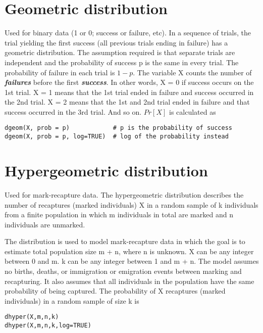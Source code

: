 \documentclass[12pt, a4paper]{article}
\theoremstyle{plain}
\theoremstyle{definition}
\theoremstyle{remark}
\begin{document}
\section{Geometric distribution}
Used for binary data (1 or 0; success or failure, etc). In a sequence of trials, the trial yielding the first success (all previous trials ending in failure) has a geometric distribution. The assumption required is that separate trials are independent and the probability of success p is the same in every trial. The probability of failure in each trial is $1 - p$.
\newpage
The variable X counts the number of \textbf{\textit{failures}} before the first \textbf{\textit{success}}. In other words, X = 0 if success occurs on the 1st trial. X = 1 means that the 1st trial ended in failure and success occurred in the 2nd trial. X = 2 means that the 1st and 2nd trial ended in failure and that success occurred in the 3rd trial. And so on. $Pr[X]$ is calculated as
\begin{framed}
\begin{verbatim}
dgeom(X, prob = p)            # p is the probability of success
dgeom(X, prob = p, log=TRUE)  # log of the probability instead
\end{verbatim}
\end{framed}

\newpage
\section{Hypergeometric distribution}
Used for mark-recapture data. The hypergeometric distribution describes the number of recaptures (marked individuals) X in a random sample of k individuals from a finite population in which m individuals in total are marked and n individuals are unmarked.

The distribution is used to model mark-recapture data in which the goal is to estimate total population size m + n, where n is unknown. X can be any integer between 0 and m. k can be any integer between 1 and m + n. The model assumes no births, deaths, or immigration or emigration events between marking and recapturing. It also assumes that all individuals in the population have the same probability of being captured. The probability of X recaptures (marked individuals) in a random sample of size k is
\begin{framed}
\begin{verbatim}
dhyper(X,m,n,k)
dhyper(X,m,n,k,log=TRUE)
\end{verbatim}
\end{framed}
\newpage
\end{document}
